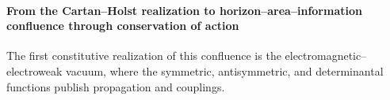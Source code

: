 \paragraph{From the Cartan–Holst realization to horizon–area–information confluence through conservation of action} The first constitutive realization of this confluence is the electromagnetic--electroweak vacuum, where the symmetric, antisymmetric, and determinantal functions publish propagation and couplings.
